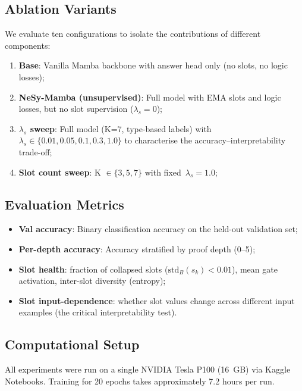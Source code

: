 \documentclass[conference]{IEEEtran}
\begin{document}
\subsection{Ablation Variants}

We evaluate ten configurations to isolate the contributions of
different components:

\begin{enumerate}[nosep]
    \item \textbf{Base}: Vanilla Mamba backbone with answer head
          only (no slots, no logic losses);
    \item \textbf{NeSy-Mamba (unsupervised)}: Full model with EMA
          slots and logic losses, but no slot supervision
          ($\lambda_s = 0$);
    \item \textbf{$\lambda_s$ sweep}: Full model (K=7, type-based
          labels) with $\lambda_s \in \{0.01, 0.05, 0.1, 0.3, 1.0\}$
          to characterise the accuracy--interpretability trade-off;
    \item \textbf{Slot count sweep}: K $\in \{3, 5, 7\}$ with
          fixed~$\lambda_s = 1.0$;
\end{enumerate}

\subsection{Evaluation Metrics}

\begin{itemize}[nosep]
    \item \textbf{Val accuracy}: Binary classification accuracy on
          the held-out validation set;
    \item \textbf{Per-depth accuracy}: Accuracy stratified by
          proof depth (0--5);
    \item \textbf{Slot health}: fraction of collapsed slots
          ($\mathrm{std}_B(s_k) < 0.01$), mean gate activation,
          inter-slot diversity (entropy);
    \item \textbf{Slot input-dependence}: whether slot values
          change across different input examples (the critical
          interpretability test).
\end{itemize}

\subsection{Computational Setup}

All experiments were run on a single NVIDIA Tesla P100 (16~GB)
via Kaggle Notebooks.  Training for 20 epochs takes approximately
7.2 hours per run.
\end{document}
